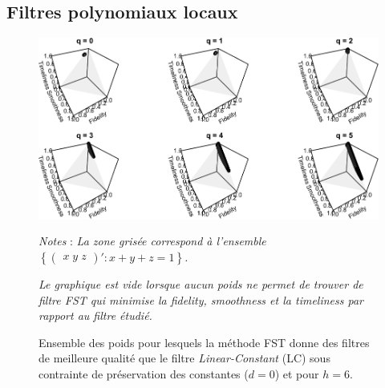 \documentclass[
  11pt,
  french,
  a4paper]{article}
\newcommand\1{\mathds{1}}
\begin{document}
\hypertarget{filtres-polynomiaux-locaux}{%
\subsection{Filtres polynomiaux locaux}\label{filtres-polynomiaux-locaux}}

\begin{figure}[H]

{\centering \includegraphics{img/bookdown/pdf/lc6d0-1} 

}

\caption[Ensemble des poids pour lesquels la méthode FST donne des filtres de meilleure qualité que le filtre \emph{Linear-Constant} (LC) sous contrainte de préservation des constantes (\(d=0\)) et pour \(h=6\)]{Ensemble des poids pour lesquels la méthode FST donne des filtres de meilleure qualité que le filtre \emph{Linear-Constant} (LC) sous contrainte de préservation des constantes (\(d=0\)) et pour \(h=6\).}\label{fig:lc6d0}

\footnotesize


\emph{Notes} : \emph{La zone grisée correspond à l'ensemble \(\left\{\begin{pmatrix}x \; y \; z \end{pmatrix}' : x+y+z=1\right\}\).}

\emph{Le graphique est vide lorsque aucun poids ne permet de trouver de filtre FST qui minimise la \emph{fidelity}, \emph{smoothness} et la \emph{timeliness} par rapport au filtre étudié.}
\normalsize\end{figure}
\end{document}
